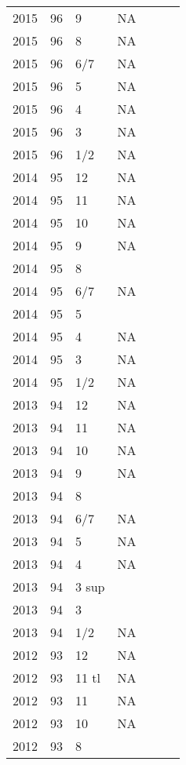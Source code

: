 \begin{longtable}{ |l|l|l|l|p{2.7cm}|l|p{2cm}| }
 2015 & 96 &     9 &      NA &  &  & \\
 2015 & 96 &     8 &      NA &  &  & \\
 2015 & 96 &   6/7 &      NA  &  &  & \\
 2015 & 96 &     5 &      NA &  &  & \\
 2015 & 96 &     4 &      NA &  &  & \\
 2015 & 96 &     3 &      NA &  &  & \\
 2015 & 96 &   1/2 &      NA &  &  & \\
 2014 & 95 &    12 &      NA &  &  & \\
 2014 & 95 &    11 &      NA &  &  & \\
 2014 & 95 &    10 &      NA &  &  & \\
 2014 & 95 &     9 &      NA &  &  & \\
 2014 & 95 &     8 &         &  &  & \\
 2014 & 95 &   6/7 &     NA  &  &  & \\
 2014 & 95 &     5 &         &  &  & \\
 2014 & 95 &     4 &     NA  &  &  & \\
 2014 & 95 &     3 &     NA  &  &  & \\
 2014 & 95 &   1/2 &    NA   &  &  & \\
 2013 & 94 &    12 &    NA   &  &   & \\
 2013 & 94 &    11 &    NA   &  &  & \\
 2013 & 94 &    10 &    NA   &  &  & \\
 2013 & 94 &     9 &    NA   &  &  & \\
 2013 & 94 &     8 &         &  &  & \\
 2013 & 94 &   6/7 &    NA   &  &  & \\
 2013 & 94 &     5 &    NA   &  &  & \\
 2013 & 94 &     4 &    NA   &  &  & \\
 2013 & 94 & 3 sup &         &  &  & \\
 2013 & 94 &     3 &         &  &  & \\
 2013 & 94 &   1/2 &    NA   &  &  & \\
 2012 & 93 &    12 &    NA   &  &  & \\
 2012 & 93 & 11 tl &    NA   &  &  & \\
 2012 & 93 & 11    &    NA   &  &  & \\
 2012 & 93 & 10    &    NA   &  &   & \\
 2012 & 93 & 8     &         &  &  & \\

\end{longtable}

